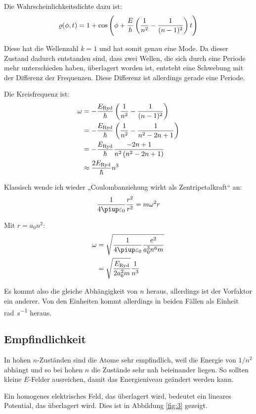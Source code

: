 Die Wahrscheinlichkeitsdichte dazu ist:
\[
	\varrho(\phi, t)
	= 1 + \cos\del{\phi + \frac{E}\hbar \del{\frac1{n^2} - \frac1{(n-1)^2}}t}
\]

Diese hat die Wellenzahl $k = 1$ und hat somit genau eine Mode. Da dieser
Zustand dadurch entstanden sind, dass zwei Wellen, die sich durch eine Periode
mehr unterschieden haben, überlagert worden ist, entsteht eine Schwebung mit
der Differenz der Frequenzen. Diese Differenz ist allerdings gerade eine
Periode.

Die Kreisfrequenz ist:
\begin{align*}
	\omega
	&= - \frac{E_\text{Ryd}}\hbar \del{\frac1{n^2} - \frac1{(n-1)^2}} \\
	&= - \frac{E_\text{Ryd}}\hbar \del{\frac1{n^2} - \frac1{n^2 - 2n + 1}} \\
	&= - \frac{E_\text{Ryd}}\hbar \frac{-2n + 1}{n^2 \del{n^2 - 2n + 1}} \\
	&\approx \frac{2E_\text{Ryd}}\hbar {n^3}
\end{align*}

Klassisch wende ich wieder „Coulombanziehung wirkt als Zentripetalkraft“ an:
\[
	\frac{1}{4\piup \varepsilon_0} \frac{r^2}{r^2} = m \omega^2 r
\]

Mit $r = a_0 n^2$:
\begin{align*}
	\omega &= \sqrt{\frac{1}{4\piup \varepsilon_0} \frac{e^2}{a_0^3 n^6 m}} \\
					   &= \sqrt{\frac{E_\text{Ryd}}{2a_0^2m}} \frac{1}{n^3}
\end{align*}

Es kommt also die gleiche Abhängigkeit von $n$ heraus, allerdings ist der
Vorfaktor ein anderer. Von den Einheiten kommt allerdings in beiden Fällen
als Einheit \si{\radian\per\second} heraus.

\subsection{Empfindlichkeit}

In hohen $n$-Zuständen sind die Atome sehr empfindlich, weil die Energie von
$1/n^2$ abhängt und so bei hohen $n$ die Zustände sehr nah beieinander liegen.
So sollten kleine $E$-Felder ausreichen, damit das Energieniveau geändert
werden kann.

Ein homogenes elektrisches Feld, das überlagert wird, bedeutet ein lineares Potential, das überlagert wird. Dies ist in Abbildung \ref{fig:3} gezeigt.

